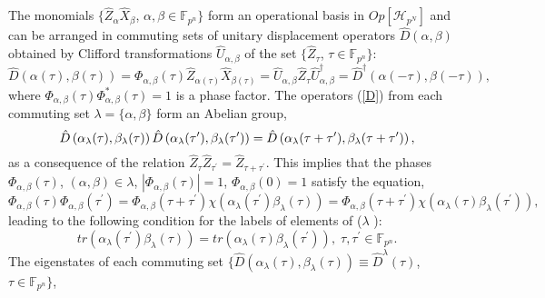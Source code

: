 \documentclass{article}
\begin{document}
The monomials $\{\hat{Z}_{\alpha }\hat{X}_{\beta }$, $\alpha ,\beta \in 
\mathbb{F}_{p^{n}}\}$ form an operational basis in $Op[\mathcal{H}_{p^{N}}]$
and can be arranged in commuting sets of unitary displacement operators $%
\hat{D}(\alpha ,\beta )$ obtained by Clifford transformations $\hat{U}%
_{\alpha ,\beta }$ of the set $\{\hat{Z}_{\tau }$, $\tau \in \mathbb{F}%
_{p^{n}}\}$:%
\begin{equation}
\hat{D}\left( \alpha (\tau ),\beta (\tau )\right) =\Phi _{\alpha ,\beta
}\left( \tau \right) \hat{Z}_{\alpha (\tau )}\hat{X}_{\beta (\tau )}=\hat{U}%
_{\alpha ,\beta }\hat{Z}_{\tau }\hat{U}_{\alpha ,\beta }^{\dagger }=\hat{D}%
^{\dagger }\left( \alpha (-\tau ),\beta (-\tau )\right) ,  \label{D}
\end{equation}%
where $\Phi _{\alpha ,\beta }\left( \tau \right) \Phi _{\alpha ,\beta
}^{\ast }\left( \tau \right) =1$ is a phase factor. The operators (\ref{D})
from each commuting set $\lambda =\{\alpha ,\beta \}$ form an Abelian group,%
\begin{equation}
\hat{D}\left( \alpha _{\lambda }(\tau ),\beta _{\lambda }(\tau )\right) \hat{%
D}\left( \alpha _{\lambda }(\tau ^{\prime }),\beta _{\lambda }(\tau ^{\prime
})\right) =\hat{D}\left( \alpha _{\lambda }(\tau +\tau ^{\prime }),\beta
_{\lambda }(\tau +\tau ^{\prime })\right) ,  \label{DD}
\end{equation}%
as a consequence of the relation $\hat{Z}_{\tau }\hat{Z}_{\tau ^{\prime }}=%
\hat{Z}_{\tau +\tau ^{\prime }}$. This implies that the phases $\Phi
_{\alpha ,\beta }\left( \tau \right) $, $(\alpha ,\beta )\in \lambda $, $%
|\Phi _{\alpha ,\beta }\left( \tau \right) |=1$, $\Phi _{\alpha ,\beta
}\left( 0\right) =1$ satisfy the equation, 
\begin{equation}
\Phi _{\alpha ,\beta }\left( \tau \right) \Phi _{\alpha ,\beta }\left( \tau
^{\prime }\right) =\Phi _{\alpha ,\beta }\left( \tau +\tau ^{\prime }\right)
\chi \left( \alpha _{\lambda }(\tau ^{\prime })\beta _{\lambda }(\tau
)\right) =\Phi _{\alpha ,\beta }\left( \tau +\tau ^{\prime }\right) \chi
\left( \alpha _{\lambda }(\tau )\beta _{\lambda }(\tau ^{\prime })\right) ,
\label{Phi}
\end{equation}%
leading to the following condition for the labels of elements of ($\lambda $%
): 
\begin{equation}
tr\left( \alpha _{\lambda }(\tau ^{\prime })\beta _{\lambda }(\tau )\right)
=tr\left( \alpha _{\lambda }(\tau )\beta _{\lambda }(\tau ^{\prime })\right)
,\;\tau ,\tau ^{\prime }\in \mathbb{F}_{p^{n}}.  \label{CC}
\end{equation}%
The eigenstates of each commuting set $\{\hat{D}\left( \alpha _{\lambda
}(\tau ),\beta _{\lambda }(\tau )\right) \equiv \hat{D}^{\lambda }(\tau )$, $%
\tau \in \mathbb{F}_{p^{n}}\}$,
\end{document}
